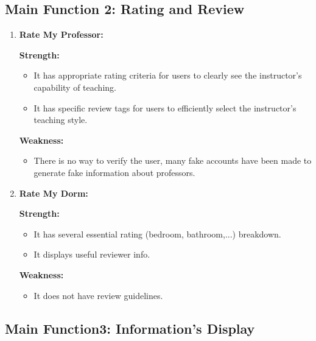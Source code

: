 \documentclass[12pt]{article}
\begin{document}
\subsection{Main Function 2: Rating and Review}

\begin{enumerate}
    \item \textbf{Rate My Professor: }
    
    \textbf{Strength: }

    \begin{itemize}
        \item It has appropriate rating criteria for users to clearly see the instructor’s capability of teaching.
        \item It has specific review tags for users to efficiently select the instructor’s teaching style. 
    \end{itemize}
    \textbf{Weakness: }
    \begin{itemize}
        \item There is no way to verify the user, many fake accounts have been made to generate fake information about professors.
    \end{itemize}
    \item \textbf{Rate My Dorm: }
    
    \textbf{Strength: }
    \begin{itemize}
        \item It has several essential rating (bedroom, bathroom,...) breakdown.
        \item It displays useful reviewer info.
    \end{itemize}
    \textbf{Weakness: }
    \begin{itemize}
        \item It does not have review guidelines.
\end{itemize}
\end{enumerate}


\subsection{Main Function3: Information’s Display}
\end{document}
